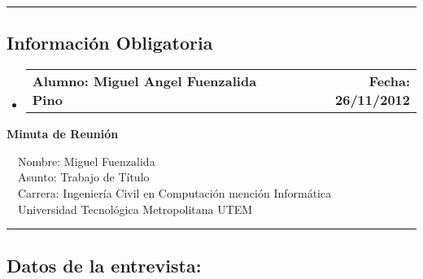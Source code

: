 \documentclass[10pt,letterpaper]{article}
\makeatletter
\newcommand{\headerrow}[2]
{\begin{tabular*}{\linewidth}{l@{\extracolsep{\fill}}r}
	#1 &
	#2 \\
\end{tabular*}}
\makeatother
\begin{document}
\hrule
\vspace{-0.4em}
\subsection*{Información Obligatoria}

\begin{itemize}
	\parskip=0.1em

	\item 
	\headerrow
		{\textbf{Alumno: Miguel Angel Fuenzalida Pino}}
		{\textbf{Fecha: 26/11/2012}}

\end{itemize}
\newpage
\begin{center}
{\LARGE \textbf{Minuta de Reunión}}

\ \ \textbullet Nombre: Miguel Fuenzalida
\\
\ \ \textbullet Asunto: Trabajo de Título
\\
\ \ \textbullet Carrera: Ingeniería Civil en Computación mención Informática
\\
\ \ \textbullet Universidad Tecnológica Metropolitana UTEM
\end{center}

\hrule
\vspace{-0.4em}
\subsection*{Datos de la entrevista:}
\end{document}
